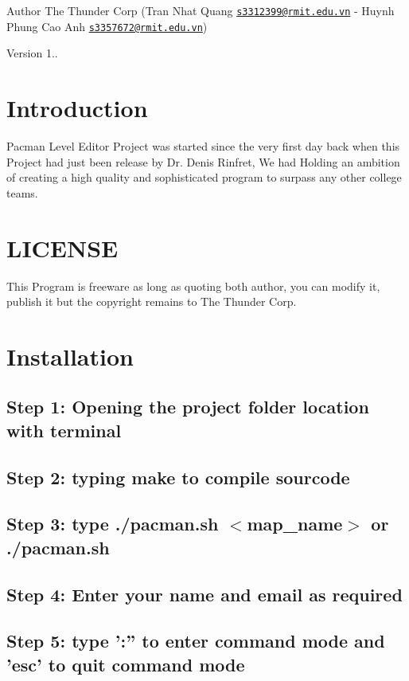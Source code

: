 \begin{DoxyAuthor}{Author}
The Thunder Corp (Tran Nhat Quang \href{mailto:s3312399@rmit.edu.vn}{\tt s3312399@rmit.\-edu.\-vn} -\/ Huynh Phung Cao Anh \href{mailto:s3357672@rmit.edu.vn}{\tt s3357672@rmit.\-edu.\-vn}) 
\end{DoxyAuthor}
\begin{DoxyVersion}{Version}
1..
\end{DoxyVersion}
\hypertarget{index_intro_sec}{}\section{Introduction}\label{index_intro_sec}
Pacman Level Editor Project was started since the very first day back when this Project had just been release by Dr. Denis Rinfret, We had Holding an ambition of creating a high quality and sophisticated program to surpass any other college teams.\hypertarget{index_LICENSE}{}\section{L\-I\-C\-E\-N\-S\-E}\label{index_LICENSE}
This Program is freeware as long as quoting both author, you can modify it, publish it but the copyright remains to The Thunder Corp.\hypertarget{index_install_sec}{}\section{Installation}\label{index_install_sec}
\hypertarget{index_step1}{}\subsection{Step 1\-: Opening the project folder location with terminal}\label{index_step1}
\hypertarget{index_step2}{}\subsection{Step 2\-: typing make to compile sourcode}\label{index_step2}
\hypertarget{index_step3}{}\subsection{Step 3\-: type ./pacman.\-sh $<$map\-\_\-name$>$ or ./pacman.\-sh}\label{index_step3}
\hypertarget{index_step4}{}\subsection{Step 4\-: Enter your name and email as required}\label{index_step4}
\hypertarget{index_step5}{}\subsection{Step 5\-: type '\-:'' to enter command mode and 'esc' to quit command mode}\label{index_step5}
